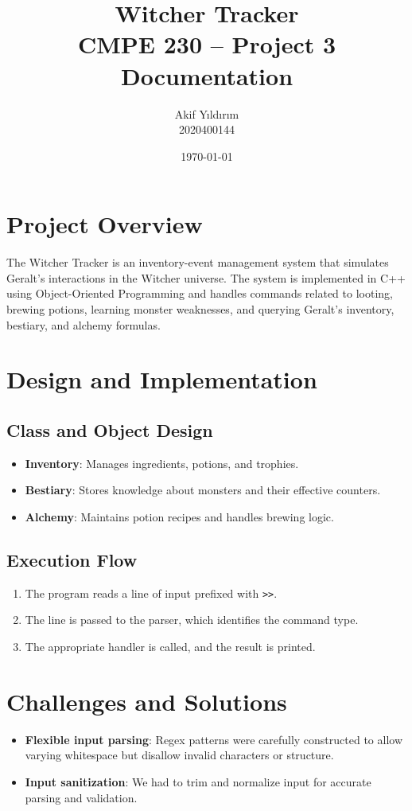 \documentclass[12pt]{article}
\title{Witcher Tracker\\CMPE 230 – Project 3 Documentation}
\author{Akif Yıldırım \\ 2020400144}
\date{\today}
\begin{document}
\maketitle

\tableofcontents

\newpage

\section{Project Overview}
The Witcher Tracker is an inventory-event management system that simulates Geralt's interactions in the Witcher universe. The system is implemented in C++ using Object-Oriented Programming and handles commands related to looting, brewing potions, learning monster weaknesses, and querying Geralt’s inventory, bestiary, and alchemy formulas.

\section{Design and Implementation}

\subsection{Class and Object Design}
\begin{itemize}
    \item \textbf{Inventory}: Manages ingredients, potions, and trophies.
    \item \textbf{Bestiary}: Stores knowledge about monsters and their effective counters.
    \item \textbf{Alchemy}: Maintains potion recipes and handles brewing logic.
\end{itemize}

\subsection{Execution Flow}
\begin{enumerate}
    \item The program reads a line of input prefixed with \texttt{>>}.
    \item The line is passed to the parser, which identifies the command type.
    \item The appropriate handler is called, and the result is printed.
\end{enumerate}

\section{Challenges and Solutions}
\begin{itemize}
    \item \textbf{Flexible input parsing}: Regex patterns were carefully constructed to allow varying whitespace but disallow invalid characters or structure.
    \item \textbf{Input sanitization}: We had to trim and normalize input for accurate parsing and validation.
\end{itemize}
\end{document}
